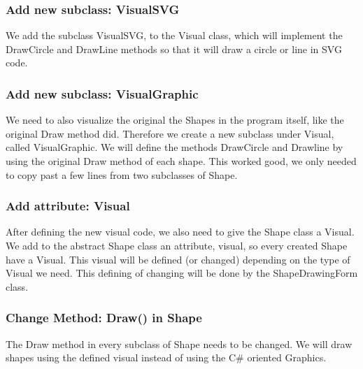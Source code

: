 \documentclass[a4paper,12pt]{article}
\begin{document}
\subsubsection{Add new subclass: VisualSVG}
We add the subclass VisualSVG, to the Visual class, which will implement the DrawCircle and DrawLine methods so that it will draw a circle or line in SVG code.

\subsubsection{Add new subclass: VisualGraphic}
We need to also visualize the original the Shapes in the program itself, like the original Draw method did. Therefore we create a new subclass under Visual, called VisualGraphic. We will define the methods DrawCircle and Drawline by using the original Draw method of each shape. This worked good, we only needed to copy past a few lines from two subclasses of Shape.

\subsubsection{Add attribute: Visual}
After defining the new visual code, we also need to give the Shape class a Visual. We add to the abstract Shape class an attribute, visual, so every created Shape have a Visual. This visual will be defined (or changed) depending on the type of Visual we need. This defining of changing will be done by the ShapeDrawingForm class.

\subsubsection{Change Method: Draw() in Shape}
The Draw method in every subclass of Shape needs to be changed. We will draw shapes using the defined visual instead of using the C\# oriented Graphics.
\end{document}
